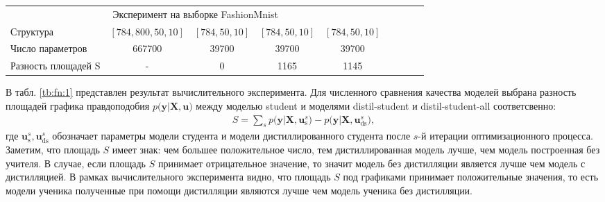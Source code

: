 \begin{table}[]
\begin{center}
{\begin{tabular}{|l|c|c|c|c|llll}
\multicolumn{5}{|c|}{Эксперимент на выборке FashionMnist}                                                     &                      &                      &                      &                      \\ \cline{1-5}
Структура           & $[784,800,50,10]$& $[784,50,10]$   & $[784,50,10]$  & $[784,50,10]$      &                      &                      &                      &                      \\ \cline{1-5}
Число параметров    &           667700                  &          39700                &         39700                &                 39700            &                      &                      &                      &                      \\ \cline{1-5}
Разность площадей S   & -                           & 0                       &  1165               & 1145                    &                      &                      &                      &                      \\ \cline{1-5}
\end{tabular}
}
\end{center}
\end{table}

В табл. \ref{tb:fn:1} представлен результат вычислительного эксперимента. Для численного сравнения качества моделей выбрана разность площадей графика правдоподобия $p\bigr(\mathbf{y}|\mathbf{X}, \mathbf{u}\bigr)$ между моделью student и моделями distil-student  и 
distil-student-all соответсвенно:
\[
\label{eq:ex:8}
\begin{aligned}
S = \sum_{s} p\bigr(\mathbf{y}|\mathbf{X}, \mathbf{u}^s_{\text{s}}\bigr) - p\bigr(\mathbf{y}|\mathbf{X}, \mathbf{u}^s_{\text{ds}}\bigr),
\end{aligned}
\]
где $\mathbf{u}^s_{\text{s}}, \mathbf{u}^s_{\text{ds}}$ обозначает параметры модели студента и модели дистиллированного студента после $s$-й итерации оптимизационного процесса. Заметим, что площадь $S$ имеет знак: чем большее положительное число, тем дистиллированная модель лучше, чем модель построенная без учителя. В случае, если площадь $S$ принимает отрицательное значение, то значит модель без дистилляции является лучше чем модель с дистилляцией. В рамках вычислительного эксперимента видно, что площадь $S$ под графиками принимает положительные значения, то есть модели ученика полученные при помощи дистилляции являются лучше чем модель ученика без дистилляции.
